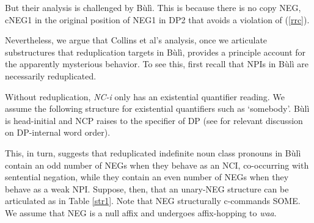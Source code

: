\documentclass[output=paper,colorlinks,citecolor=brown]{langscibook}
\begin{document}
\z



But their analysis is challenged by Bùlì. This is because there is no copy NEG, cNEG1 in the original position of NEG1 in DP2 that avoids a violation of (\ref{rrc}).


\z

Nevertheless, we argue that Collins et al's analysis, once we articulate substructures that reduplication targets in Bùlì, provides a principle account for the apparently mysterious behavior. To see this, first recall that NPIs in Bùlì are necessarily reduplicated.

\z

\z

Without reduplication, \textit{NC-i} only has an existential quantifier reading. We assume the following structure for existential quantifiers such as `somebody'. Bùlì is head-initial and NCP raises to the specifier of DP (see \citealt{HiraiwaEtAl2017} for relevant discussion on DP-internal word order).

\z


This, in turn,  suggests that reduplicated indefinite noun class pronouns in Bùlì contain an odd number of NEGs when they behave as an NCI,  co-occurring with sentential negation, while they contain an even number of NEGs when they behave as a weak NPI. Suppose, then, that an unary-NEG structure can be articulated as in Table \ref{str1}.  Note that NEG structurally c-commands SOME. We assume that NEG is a null affix and undergoes affix-hopping to \textit{waa}.
\end{document}
